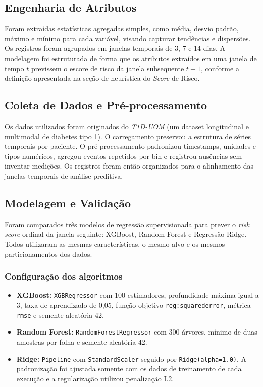 \documentclass[12pt,a4paper]{article}
\DeclareRobustCommand{\sigla}[1]{%
    \texorpdfstring{\hyperlink{sigla:#1}{#1}}{#1}%
}
\begin{document}
\subsection{Engenharia de Atributos}
Foram extraídas estatísticas agregadas simples, como média, desvio padrão,
máximo e mínimo para cada variável, visando capturar tendências e dispersões.
Os registros foram agrupados em janelas temporais de 3, 7 e 14 dias. A
modelagem foi estruturada de forma que os atributos extraídos em uma janela de
tempo $t$ previssem o escore de risco da janela subsequente $t+1$, conforme a
definição apresentada na seção de heurística do \textit{Score} de Risco.

\subsection{Coleta de Dados e Pré-processamento}
Os dados utilizados foram originados do \textit{\sigla{T1D-UOM}} (um dataset longitudinal
e multimodal de diabetes tipo 1). O carregamento preservou a estrutura de
séries temporais por paciente. O pré-processamento padronizou timestamps,
unidades e tipos numéricos, agregou eventos repetidos por bin e registrou
ausências sem inventar medições. Os registros foram então organizados para o
alinhamento das janelas temporais de análise preditiva.

\subsection{Modelagem e Validação}
Foram comparados três modelos de regressão supervisionada para prever o
\textit{risk score} ordinal da janela seguinte: XGBoost, Random Forest e
Regressão Ridge. Todos utilizaram as mesmas características, o mesmo alvo e
os mesmos particionamentos dos dados.

\subsubsection{Configuração dos algoritmos}
\begin{itemize}
    \item \textbf{XGBoost:} \texttt{XGBRegressor} com 100 estimadores,
    profundidade máxima igual a 3, taxa de aprendizado de 0,05, função objetivo
    \texttt{reg:squarederror}, métrica \texttt{rmse} e semente aleatória 42.
    \item \textbf{Random Forest:} \texttt{RandomForestRegressor} com 300
    árvores, mínimo de duas amostras por folha e semente aleatória 42.
    \item \textbf{Ridge:} \texttt{Pipeline} com \texttt{StandardScaler} seguido
    por \texttt{Ridge(alpha=1.0)}. A padronização foi ajustada somente com os
    dados de treinamento de cada execução e a regularização utilizou penalização
    L2.
\end{itemize}
\end{document}
